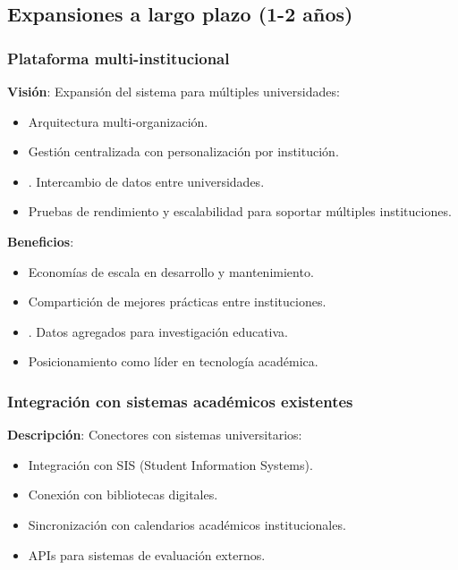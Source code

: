 \documentclass[12pt,a4paper,oneside]{report}
\providecommand{\tightlist}{%
  \setlength{\itemsep}{0pt}\setlength{\parskip}{0pt}}
\begin{document}
\subsection{Expansiones a largo plazo (1-2
años)}\label{expansiones-a-largo-plazo-1-2-auxf1os}

\subsubsection{Plataforma
multi-institucional}\label{plataforma-multi-institucional}

\textbf{Visión}: Expansión del sistema para múltiples universidades:

\begin{itemize}
\tightlist
\item
  Arquitectura multi-organización.
\item
  Gestión centralizada con personalización por institución.
\item.
  Intercambio de datos entre universidades.
\item
  Pruebas de rendimiento y escalabilidad para soportar múltiples instituciones.
\end{itemize}

\textbf{Beneficios}:

\begin{itemize}
\tightlist
\item
  Economías de escala en desarrollo y mantenimiento.
\item
  Compartición de mejores prácticas entre instituciones.
\item.
  Datos agregados para investigación educativa.
\item
  Posicionamiento como líder en tecnología académica.
\end{itemize}

\subsubsection{Integración con sistemas académicos
existentes}\label{integraciuxf3n-con-sistemas-acaduxe9micos-existentes}

\textbf{Descripción}: Conectores con sistemas universitarios:

\begin{itemize}
\tightlist
\item
  Integración con SIS (Student Information Systems).
\item
  Conexión con bibliotecas digitales.
\item
  Sincronización con calendarios académicos institucionales.
\item
  APIs para sistemas de evaluación externos.
\end{itemize}
\end{document}

